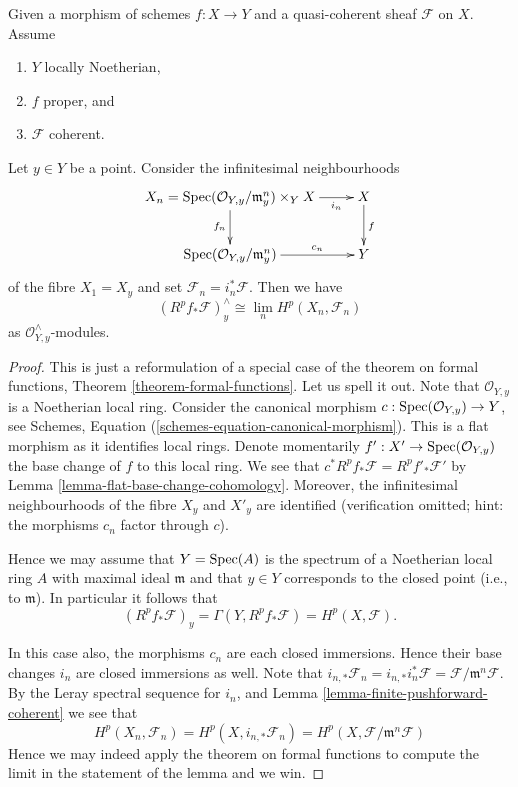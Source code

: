\begin{lemma}
\label{lemma-formal-functions-stalk}
Given a morphism of schemes $f : X \to Y$ and a quasi-coherent sheaf
$\mathcal{F}$ on $X$. Assume
\begin{enumerate}
\item $Y$ locally Noetherian,
\item $f$ proper, and
\item $\mathcal{F}$ coherent.
\end{enumerate}
Let $y \in Y$ be a point. Consider the infinitesimal neighbourhoods
$$
\xymatrix{
X_n =
\Spec(\mathcal{O}_{Y, y}/\mathfrak m_y^n) \times_Y X
\ar[r]_-{i_n} \ar[d]_{f_n} &
X \ar[d]^f \\
\Spec(\mathcal{O}_{Y, y}/\mathfrak m_y^n) \ar[r]^-{c_n} & Y
}
$$
of the fibre $X_1 = X_y$ and set $\mathcal{F}_n = i_n^*\mathcal{F}$.
Then we have
$$
\left(R^pf_*\mathcal{F}\right)_y^\wedge
\cong
\lim_n H^p(X_n, \mathcal{F}_n)
$$
as $\mathcal{O}_{Y, y}^\wedge$-modules.
\end{lemma}

\begin{proof}
This is just a reformulation of a special case of the theorem
on formal functions, Theorem \ref{theorem-formal-functions}.
Let us spell it out. Note that $\mathcal{O}_{Y, y}$ is a Noetherian
local ring. Consider the canonical morphism
$c : \mathop{\mathrm{Spec}}(\mathcal{O}_{Y, y}) \to Y$, see
Schemes, Equation (\ref{schemes-equation-canonical-morphism}).
This is a flat morphism as it identifies local rings.
Denote momentarily $f' : X' \to \mathop{\mathrm{Spec}}(\mathcal{O}_{Y, y})$
the base change of $f$ to this local ring. We see that
$c^*R^pf_*\mathcal{F} = R^pf'_*\mathcal{F}'$ by
Lemma \ref{lemma-flat-base-change-cohomology}.
Moreover, the infinitesimal neighbourhoods of
the fibre $X_y$ and $X'_y$ are identified (verification omitted; hint:
the morphisms $c_n$ factor through $c$).

\medskip\noindent
Hence we may assume that $Y = \mathop{\mathrm{Spec}}(A)$ is the spectrum of
a Noetherian local ring $A$ with maximal ideal $\mathfrak m$
and that $y \in Y$ corresponds to the closed point (i.e., to $\mathfrak m$).
In particular it follows that
$$
\left(R^pf_*\mathcal{F}\right)_y =
\Gamma(Y, R^pf_*\mathcal{F}) =
H^p(X, \mathcal{F}).
$$

\medskip\noindent
In this case also, the morphisms $c_n$ are each closed immersions.
Hence their base changes $i_n$ are closed immersions as well.
Note that $i_{n, *}\mathcal{F}_n = i_{n, *}i_n^*\mathcal{F}
= \mathcal{F}/\mathfrak m^n\mathcal{F}$. By the Leray spectral sequence
for $i_n$, and Lemma \ref{lemma-finite-pushforward-coherent} we see that
$$
H^p(X_n, \mathcal{F}_n) =
H^p(X, i_{n, *}\mathcal{F}_n) =
H^p(X, \mathcal{F}/\mathfrak m^n\mathcal{F})
$$
Hence we may indeed apply the theorem on formal functions to compute
the limit in the statement of the lemma and we win.
\end{proof}

